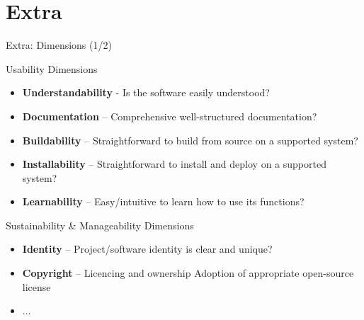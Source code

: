 \documentclass[compress]{beamer}
\begin{document}
\begin{frame}
\footnotesize


\end{frame}

\section{Extra}

\begin{frame}{Extra: Dimensions (1/2)}
    \begin{block}{Usability Dimensions}
        \begin{itemize}    
            \item \textbf{Understandability} - Is the software easily understood? 
            \item \textbf{Documentation} -- Comprehensive well-structured documentation?
            \item \textbf{Buildability}  -- Straightforward to build from source on a supported system?
            \item \textbf{Installability} -- Straightforward to install and deploy on a supported system?
            \item \textbf{Learnability} -- Easy/intuitive to learn how to use its functions?
        \end{itemize}
    \end{block}
    \begin{block}{Sustainability \& Manageability Dimensions}
        \begin{itemize}    
            \item \textbf{Identity} -- Project/software identity is clear and unique? 
            \item \textbf{Copyright} -- Licencing and ownership Adoption of appropriate open-source license
            \item ...
        \end{itemize}
    \end{block}
\end{frame}
\end{document}
